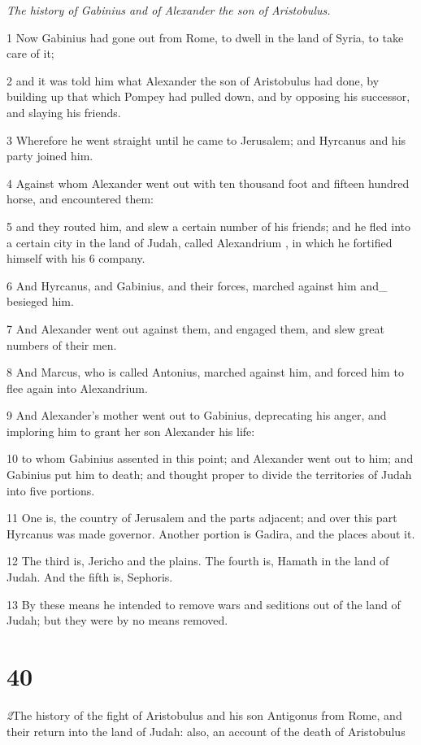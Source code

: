 \par \textit{The history of Gabinius and of Alexander the son of Aristobulus.}

1 Now Gabinius had gone out from Rome, to dwell in the land of Syria, to take care of it; 

2 and it was told him what Alexander the son of Aristobulus had done, by building up that which Pompey had pulled down, and by opposing his successor, and slaying his friends. 

3 Wherefore he went straight until he came to Jerusalem; and Hyrcanus and his party joined him. 

4 Against whom Alexander went out with ten thousand foot and fifteen hundred horse, and encountered them: 

5 and they routed him, and slew a certain number of his friends; and he fled into a certain city in the land of Judah, called Alexandrium , in which he fortified himself with his 6 company. 

6 And Hyrcanus, and Gabinius, and their forces, marched against him and_ besieged him. 

7 And Alexander went out against them, and engaged them, and slew great numbers of their men. 

8 And Marcus, who is called Antonius, marched against him, and forced him to flee again into Alexandrium.

9 And Alexander’s mother went out to Gabinius, deprecating his anger, and imploring him to grant her son Alexander his life: 

10 to whom Gabinius assented in this point; and Alexander went out to him; and Gabinius put him to death; and thought proper to divide the territories of Judah into five portions. 

11 One is, the country of Jerusalem and the parts adjacent; and over this part Hyrcanus was made governor. Another portion is Gadira, and the places about it. 

12 The third is, Jericho and the plains. The fourth is, Hamath in the land of Judah. And the fifth is, Sephoris. 

13 By these means he intended to remove wars and seditions out of the land of Judah; but they were by no means removed. 

\chapter{40}

\par \textit2{The history of the fight of Aristobulus and his son Antigonus from Rome, and their return into the land of Judah: also, an account of the death of Aristobulus}

